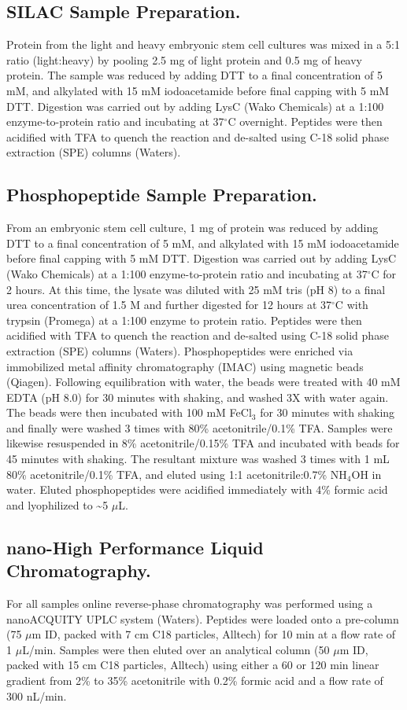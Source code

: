 \subsection{SILAC Sample Preparation.}
Protein from the light and heavy embryonic stem cell cultures was mixed in a 5:1 ratio (light:heavy) by pooling 2.5 mg of light protein and 0.5 mg of heavy protein. The sample was reduced by adding DTT to a final concentration of 5 mM, and alkylated with 15 mM iodoacetamide before final capping with 5 mM DTT. Digestion was carried out by adding LysC (Wako Chemicals) at a 1:100 enzyme-to-protein ratio and incubating at 37$^\circ$C overnight. Peptides were then acidified with TFA to quench the reaction and de-salted using C-18 solid phase extraction (SPE) columns (Waters).

\subsection{Phosphopeptide Sample Preparation.}
From an embryonic stem cell culture, 1 mg of protein was reduced by adding DTT to a final concentration of 5 mM, and alkylated with 15 mM iodoacetamide before final capping with 5 mM DTT. Digestion was carried out by adding LysC (Wako Chemicals) at a 1:100 enzyme-to-protein ratio and incubating at 37$^\circ$C for 2 hours. At this time, the lysate was diluted with 25 mM tris (pH 8) to a final urea concentration of 1.5 M and further digested for 12 hours at 37$^\circ$C with trypsin (Promega) at a 1:100 enzyme to protein ratio. Peptides were then acidified with TFA to quench the reaction and de-salted using C-18 solid phase extraction (SPE) columns (Waters).
Phosphopeptides were enriched via immobilized metal affinity chromatography (IMAC) using magnetic beads (Qiagen). Following equilibration with water, the beads were treated with 40 mM EDTA (pH 8.0) for 30 minutes with shaking, and washed 3X with water again. The beads were then incubated with 100 mM FeCl$_3$ for 30 minutes with shaking and finally were washed 3 times with 80\% acetonitrile/0.1\% TFA. Samples were likewise resuspended in 8\% acetonitrile/0.15\% TFA and incubated with beads for 45 minutes with shaking. The resultant mixture was washed 3 times with 1 mL 80\% acetonitrile/0.1\% TFA, and eluted using 1:1 acetonitrile:0.7\% NH$_4$OH in water. Eluted phosphopeptides were acidified immediately with 4\% formic acid and lyophilized to \textasciitilde5 $\mu$L.

\subsection{nano-High Performance Liquid Chromatography.}
For all samples online reverse-phase chromatography was performed using a nanoACQUITY UPLC system (Waters). Peptides were loaded onto a pre-column (75 $\mu$m ID, packed with 7 cm C18 particles, Alltech) for 10 min at a flow rate of 1 $\mu$L/min. Samples were then eluted over an analytical column (50 $\mu$m ID, packed with 15 cm C18 particles, Alltech) using either a 60 or 120 min linear gradient from 2\% to 35\% acetonitrile with 0.2\% formic acid and a flow rate of 300 nL/min.

